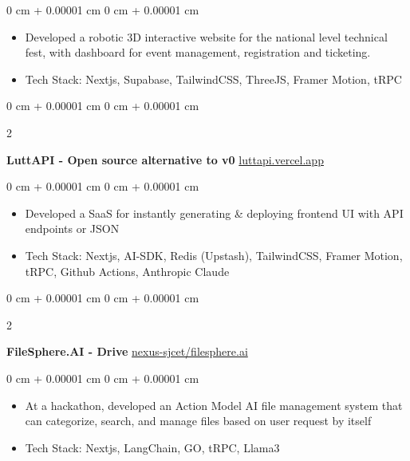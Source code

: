 \documentclass[10pt, letterpaper]{article}
\newenvironment{highlights}{
    \begin{itemize}[
        topsep=0.10 cm,
        parsep=0.10 cm,
        partopsep=0pt,
        itemsep=0pt,
        leftmargin=0 cm + 10pt
    ]
}{
    \end{itemize}
} %
\newenvironment{onecolentry}{
    \begin{adjustwidth}{
        0 cm + 0.00001 cm
    }{
        0 cm + 0.00001 cm
    }
}{
    \end{adjustwidth}
} %
\newenvironment{twocolentry}[2][]{
    \onecolentry
    \def\secondColumn{#2}
    \setcolumnwidth{\fill, 4.5 cm}
    \begin{paracol}{2}
}{
    \switchcolumn \raggedleft \secondColumn
    \end{paracol}
    \endonecolentry
} %
\begin{document}
\vspace{0.10 cm}
\begin{onecolentry}
    \begin{highlights}
        \item Developed a robotic 3D interactive website for the national level technical
        fest, with dashboard for event management, registration and ticketing.
        \item Tech Stack: Nextjs, Supabase, TailwindCSS, ThreeJS, Framer Motion, tRPC
    \end{highlights}
\end{onecolentry}

\vspace{0.2 cm}

\begin{twocolentry}{
        \href{https://luttapi.vercel.app/}{luttapi.vercel.app}
    }
    \textbf{LuttAPI - Open source alternative to v0}\end{twocolentry}

\vspace{0.10 cm}
\begin{onecolentry}
    \begin{highlights}
        \item Developed a SaaS for instantly generating \& deploying frontend UI with API
        endpoints or JSON
        \item Tech Stack: Nextjs, AI-SDK, Redis (Upstash), TailwindCSS, Framer Motion, tRPC,
        Github Actions, Anthropic Claude
    \end{highlights}
\end{onecolentry}

\vspace{0.2 cm}

\begin{twocolentry}{
        \href{https://github.com/nexus-sjcet/filesphere.ai}{nexus-sjcet/filesphere.ai}
    }
    \textbf{FileSphere.AI - Drive}\end{twocolentry}

\vspace{0.10 cm}
\begin{onecolentry}
    \begin{highlights}
        \item At a hackathon, developed an Action Model AI file management system that can
        categorize, search, and manage files based on user request by itself
        \item Tech Stack: Nextjs, LangChain, GO, tRPC, Llama3
    \end{highlights}
\end{onecolentry}
\vspace{0.2 cm}
\end{document}
